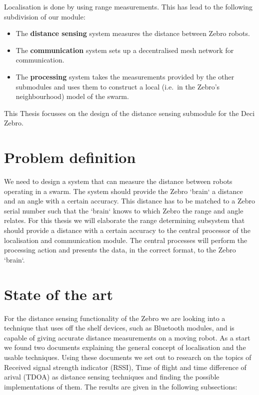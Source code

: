 Localisation is done by using range measurements.
This has lead to the following subdivision of our module:
\begin{itemize}
  \item
    The \textbf{distance sensing} system measures the distance between Zebro robots.
  \item
    The \textbf{communication} system sets up a decentralised mesh network for communication.
  \item
    The \textbf{processing} system takes the measurements provided by the other submodules and uses them to construct a local (i.e.\ in the Zebro's neighbourhood) model of the swarm.
\end{itemize}

This Thesis focusses on the design of the distance sensing submodule for the Deci Zebro.

\section{Problem definition}

We need to design a system that can measure the distance between robots operating in a swarm.
The system should provide the Zebro `brain` a distance and an angle with a certain accuracy.
This distance has to be matched to a Zebro serial number such that the `brain` knows to which Zebro the range and angle relates.
For this thesis we will elaborate the range determining subsystem that should provide a distance with a certain accuracy to the central processor of the localisation and communication module.
The central processes will perform the processing action and presents the data, in the correct format, to the Zebro `brain`.

\section{State of the art}

For the distance sensing functionality of the Zebro we are looking into a technique that uses off the shelf devices, such as Bluetooth modules, and is capable of giving accurate distance measurements on a moving robot.
As a start we found two documents \cite{Ekberg2009,Kuriakose2014} explaining the general concept of localisation and the usable techniques.
Using these documents we set out to research on the topics of Received signal strength indicator (RSSI), Time of flight and time difference of arival (TDOA) as distance sensing techniques and finding the possible implementations of them.
The results are given in the following subsections:

